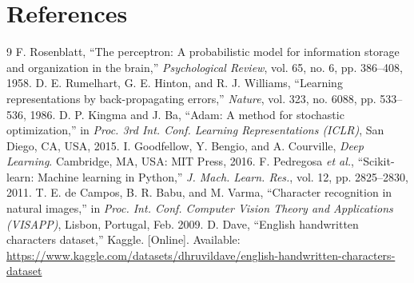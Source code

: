 \documentclass[12pt,a4paper]{article}
\begin{document}
\section{References}
\begin{thebibliography}{9}
 F. Rosenblatt, ``The perceptron: A probabilistic model for information storage and organization in the brain,'' \textit{Psychological Review}, vol. 65, no. 6, pp. 386--408, 1958.
 D. E. Rumelhart, G. E. Hinton, and R. J. Williams, ``Learning representations by back-propagating errors,'' \textit{Nature}, vol. 323, no. 6088, pp. 533--536, 1986.
 D. P. Kingma and J. Ba, ``Adam: A method for stochastic optimization,'' in \textit{Proc. 3rd Int. Conf. Learning Representations (ICLR)}, San Diego, CA, USA, 2015.
 I. Goodfellow, Y. Bengio, and A. Courville, \textit{Deep Learning}. Cambridge, MA, USA: MIT Press, 2016.
 F. Pedregosa \textit{et al.}, ``Scikit-learn: Machine learning in Python,'' \textit{J. Mach. Learn. Res.}, vol. 12, pp. 2825--2830, 2011.
 T. E. de Campos, B. R. Babu, and M. Varma, ``Character recognition in natural images,'' in \textit{Proc. Int. Conf. Computer Vision Theory and Applications (VISAPP)}, Lisbon, Portugal, Feb. 2009.
 D. Dave, ``English handwritten characters dataset,'' Kaggle. [Online]. Available: \url{https://www.kaggle.com/datasets/dhruvildave/english-handwritten-characters-dataset}
\end{thebibliography}
\end{document}
